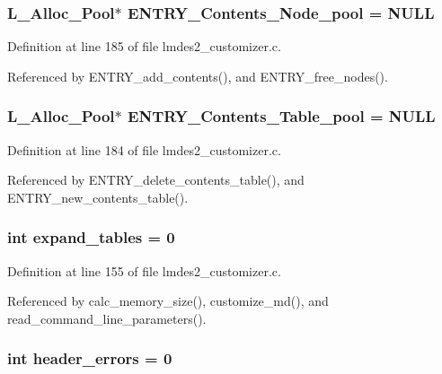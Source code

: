 \subsubsection{\setlength{\rightskip}{0pt plus 5cm}\bf{L\_\-Alloc\_\-Pool}$\ast$ \bf{ENTRY\_\-Contents\_\-Node\_\-pool} = \bf{NULL}}\label{lmdes2__customizer_8c_8f9a19ca198e5d6477591152edc4b9e9}




Definition at line 185 of file lmdes2\_\-customizer.c.

Referenced by ENTRY\_\-add\_\-contents(), and ENTRY\_\-free\_\-nodes().
\subsubsection{\setlength{\rightskip}{0pt plus 5cm}\bf{L\_\-Alloc\_\-Pool}$\ast$ \bf{ENTRY\_\-Contents\_\-Table\_\-pool} = \bf{NULL}}\label{lmdes2__customizer_8c_28bf32dd862451062fe00d50a0e83cac}




Definition at line 184 of file lmdes2\_\-customizer.c.

Referenced by ENTRY\_\-delete\_\-contents\_\-table(), and ENTRY\_\-new\_\-contents\_\-table().
\subsubsection{\setlength{\rightskip}{0pt plus 5cm}int \bf{expand\_\-tables} = 0}\label{lmdes2__customizer_8c_563cdd5e89becf23ee5a738704c6f08f}




Definition at line 155 of file lmdes2\_\-customizer.c.

Referenced by calc\_\-memory\_\-size(), customize\_\-md(), and read\_\-command\_\-line\_\-parameters().
\subsubsection{\setlength{\rightskip}{0pt plus 5cm}int \bf{header\_\-errors} = 0}\label{lmdes2__customizer_8c_b0b0139b9ffe1f2089e4e43fb71fb4d3}




